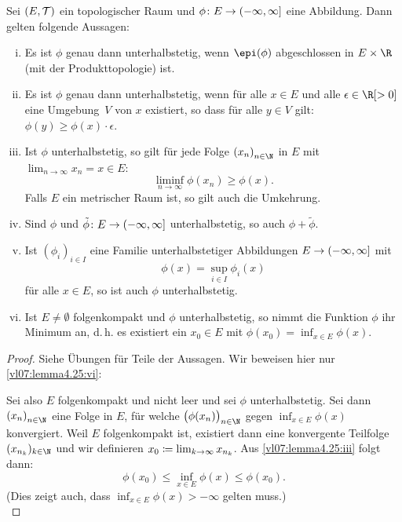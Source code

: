 \begin{thLemma} \label{vl07:lemma4.25}
    Sei $(E,\operatorname{\mathcal{T}})$ ein topologischer Raum und $\phi\colon E\to
    (-\infty,\infty]$ eine Abbildung. Dann gelten folgende Aussagen:
    \begin{enumerate}[(i)]
        \item \label{vl07:lemma4.25:i}
            Es ist $\phi$ genau dann unterhalbstetig, wenn $\epi(\phi)$
            abgeschlossen in $E\times\R$ (mit der Produkttopologie) ist.
            
        \item \label{vl07:lemma4.25:ii}
            Es ist $\phi$ genau dann unterhalbstetig, wenn für alle $x\in E$
            und alle $\epsilon\in\R[>0]$ eine Umgebung~$V$ von $x$ existiert, so
            dass für alle $y\in V$ gilt:
            $\phi(y)\geq\phi(x)\cdot\epsilon$.
            
        \item \label{vl07:lemma4.25:iii}
            Ist $\phi$ unterhalbstetig, so gilt für jede Folge $\nSeq x$ in $E$
            mit $\lim_{n\to\infty} x_n = x\in E$:
            \[ \liminf_{n\to\infty} \phi(x_n) \geq \phi(x) . \]
            Falls $E$ ein metrischer Raum ist, so gilt auch die Umkehrung.
            
        \item \label{vl07:lemma4.25:iv}
            Sind $\phi$ und $\tilde\phi\colon E\to(-\infty,\infty]$ unterhalbstetig, 
            so auch $\phi+\tilde\phi$.
            
        \item \label{vl07:lemma4.25:v}
            Ist $(\phi_i)_{i\in I}$ eine Familie unterhalbstetiger
            Abbildungen $E\to(-\infty,\infty]$ mit
            \[ \phi(x) = \sup_{i\in I} \phi_i(x)  \]
            für alle $x\in E$, so ist auch $\phi$ unterhalbstetig.
            
        \item \label{vl07:lemma4.25:vi}
            Ist $E\neq\emptyset$ folgenkompakt und $\phi$ unterhalbstetig, so
            nimmt die Funktion $\phi$ ihr Minimum an, d.\,h. es existiert ein
            $x_0\in E$ mit $\phi(x_0) = \inf_{x\in E} \phi(x)$.
    \end{enumerate}
\end{thLemma}

\begin{proof}
    Siehe Übungen für Teile der Aussagen. Wir beweisen hier nur
    \ref{vl07:lemma4.25:vi}:
    
    Sei also $E$ folgenkompakt und nicht leer und sei $\phi$ unterhalbstetig.
    Sei dann $\nSeq x$ eine Folge in $E$, für welche
    $\bigl(\phi(x_n)\bigr)_{n\in\N}$ gegen $\inf_{x\in E} \phi(x)$ konvergiert.
    Weil $E$ folgenkompakt ist, existiert dann eine konvergente Teilfolge
    $(x_{n_k})_{k\in\N}$ und wir definieren $x_0 \coloneqq \lim_{k\to\infty}
    x_{n_k}$. Aus \ref{vl07:lemma4.25:iii} folgt dann:
    \[ \phi(x_0) \leq \inf_{x\in E} \phi(x) \leq \phi(x_0)  . \]
    (Dies zeigt auch, dass $\inf_{x\in E} \phi(x) > -\infty$ gelten muss.)
    \\
\end{proof}

